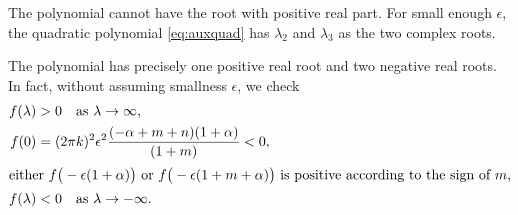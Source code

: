 \documentclass[a4paper,11pt]{article}
\theoremstyle{remark}
\begin{document}
The polynomial cannot have the root with positive real part. For small enough $\epsilon$, the quadratic polynomial \eqref{eq:auxquad} has $\lambda_2$ and $\lambda_3$ as the two complex roots. %

The polynomial has precisely one positive real root and two negative real roots. In fact, without assuming smallness $\epsilon$, we check
\begin{align*}
 f(\lambda) &>0 \quad \text {as $\lambda\rightarrow \infty$,}\\
 f(0) &= (2\pi k)^2 \epsilon^2\frac{(-\alpha+m+n)(1+\alpha)}{(1+m)} < 0,\\
 \intertext{either $f\big(-\epsilon(1+\alpha)\big)$ or $f\big(-\epsilon(1+m+\alpha)\big)$ is positive according to the sign of $m$,}
 f(\lambda) &<0 \quad \text {as $\lambda \rightarrow -\infty$.}
\end{align*}
\end{document}
